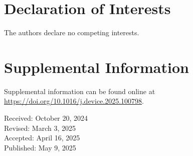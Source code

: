 \documentclass[11pt]{article}
\begin{document}
\section*{Declaration of Interests}
The authors declare no competing interests.

\section*{Supplemental Information}
Supplemental information can be found online at \url{https://doi.org/10.1016/j.device.2025.100798}.

\medskip
\noindent Received: October 20, 2024 \\
Revised: March 3, 2025 \\
Accepted: April 16, 2025 \\
Published: May 9, 2025
\end{document}
